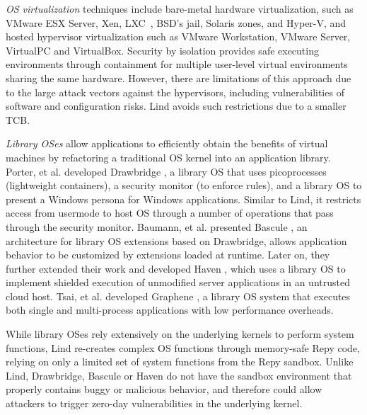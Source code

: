 \textit{OS virtualization}
techniques include
bare-metal hardware virtualization, such as VMware ESX Server, Xen,
LXC~\cite{LXC}, BSD's jail, Solaris zones, and Hyper-V, and
hosted hypervisor virtualization such as VMware
Workstation, VMware Server, VirtualPC and VirtualBox.
Security by isolation \cite{Qubes, Overshadow, SecureVM, HypSec}
provides safe executing environments through containment for multiple
user-level virtual environments sharing the same hardware.
However, there are limitations of this approach due to
the large attack vectors against the hypervisors, including
vulnerabilities of software and configuration risks. Lind avoids such restrictions due to a smaller TCB.

\textit{Library OSes}
allow applications to efficiently obtain the benefits of virtual machines
by refactoring a traditional OS kernel into an application library. 
Porter, et al. developed Drawbridge \cite{Drawbridge-11}, 
a library OS that uses picoprocesses (lightweight containers), 
a security monitor (to enforce rules),
and a library OS to present a Windows persona for %
Windows applications. Similar to Lind,
it restricts access from usermode to host OS through a number
of operations that pass through the security monitor.
%
%
Baumann, et al. presented Bascule \cite{Bascule}, an architecture for library OS extensions
based on Drawbridge, allows application behavior to be customized by
extensions loaded at runtime. Later on, they further extended their work and developed Haven \cite{Haven},
which uses a library OS to implement
shielded execution of unmodified server applications
in an untrusted cloud host.
Tsai, et al. developed Graphene \cite{Graphene-14}, a library OS system that
executes both single and
multi-process applications with low performance overheads.

While library OSes rely extensively on
the underlying kernels to perform system functions,
Lind re-creates complex OS functions through memory-safe Repy
code, relying on only a limited set of system functions from the Repy
sandbox. Unlike Lind, Drawbridge, Bascule or Haven
do not have the sandbox environment that properly contains
buggy or malicious behavior, and therefore could allow attackers
to trigger zero-day vulnerabilities in the underlying kernel.
